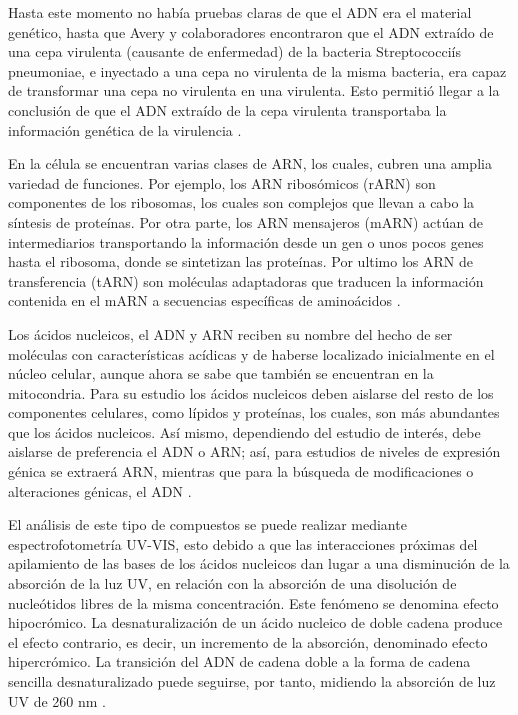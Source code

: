 \documentclass[fleqn,10pt]{SelfArx}
\begin{document}
	Hasta este momento no había pruebas claras de que el ADN era el material genético, hasta que Avery y colaboradores encontraron que el ADN extraído de una cepa virulenta (causante de enfermedad) de la bacteria Streptococciís pneumoniae, e inyectado a una cepa no virulenta de la misma bacteria, era capaz de transformar una cepa no virulenta en una virulenta. Esto permitió llegar a la conclusión de que el ADN extraído de la cepa virulenta transportaba la información genética de la virulencia \cite{dahm2005friedrich}.
	
	En la célula se encuentran varias clases de ARN, los cuales, cubren una amplia variedad de funciones. Por ejemplo, los ARN ribosómicos (rARN) son componentes de los ribosomas, los cuales son complejos que llevan a cabo la síntesis de proteínas. Por otra parte, los ARN mensajeros (mARN) actúan de intermediarios transportando la información desde un gen o unos pocos genes hasta el ribosoma, donde se sintetizan las proteínas. Por ultimo los ARN de transferencia (tARN) son moléculas adaptadoras que traducen la información contenida en el mARN a secuencias específicas de aminoácidos \cite{nelson2008lehninger, watson1953molecular, maddox2003double}.
	
	Los ácidos nucleicos, el ADN y ARN reciben su nombre del hecho de ser moléculas con características acídicas y de haberse localizado inicialmente en el núcleo celular, aunque ahora se sabe que también se encuentran en la mitocondria. Para su estudio los ácidos nucleicos deben aislarse del resto de los componentes celulares, como lípidos y proteínas, los cuales, son más abundantes que los ácidos nucleicos. Así mismo, dependiendo del estudio de interés, debe aislarse de preferencia el ADN o ARN; así, para estudios de niveles de expresión génica se extraerá ARN, mientras que para la búsqueda de modificaciones o alteraciones génicas, el ADN \cite{dahm2005friedrich, watson1953molecular, maddox2003double}.
	
	El análisis de este tipo de compuestos se puede realizar mediante espectrofotometría UV-VIS, esto debido a que las interacciones próximas del apilamiento de las bases de los ácidos nucleicos dan lugar a una disminución de la absorción de la luz UV, en relación con la absorción de una disolución de nucleótidos libres de la misma concentración. Este fenómeno se denomina efecto hipocrómico. La desnaturalización de un ácido nucleico de doble cadena produce el efecto contrario, es decir, un incremento de la absorción, denominado efecto hipercrómico. La transición del ADN de cadena doble a la forma de cadena sencilla desnaturalizado puede seguirse, por tanto, midiendo la absorción de luz UV de 260 nm \cite{nelson2008lehninger}.
	\newpage
	
\end{document}

